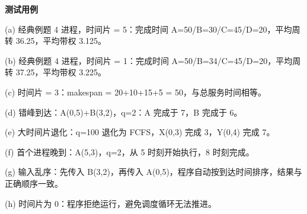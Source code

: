 {
\fontsize{7.5pt}{10pt}\selectfont
\setlength{\parindent}{0pt}
\noindent\textbf{测试用例}\par
\noindent (a) 经典例题 4 进程，时间片 = 5：完成时间 A=50/B=30/C=45/D=20，平均周转 36.25，平均带权 3.125。\par
\noindent (b) 经典例题 4 进程，时间片 = 1：完成时间 A=50/B=34/C=45/D=20，平均周转 37.25，平均带权 3.225。\par
\noindent (c) 时间片 = 3：makespan = 20+10+15+5 = 50，与总服务时间相等。\par
\noindent (d) 错峰到达：A(0,5)+B(3,2)，q=2：A 完成于 7，B 完成于 6。\par
\noindent (e) 大时间片退化：q=100 退化为 FCFS，X(0,3) 完成 3，Y(0,4) 完成 7。\par
\noindent (f) 首个进程晚到：A(5,3)，q=2，从 5 时刻开始执行，8 时刻完成。\par
\noindent (g) 输入乱序：先传入 B(3,2)，再传入 A(0,5)，程序自动按到达时间排序，结果与正确顺序一致。\par
\noindent (h) 时间片为 0：程序拒绝运行，避免调度循环无法推进。\par
}

